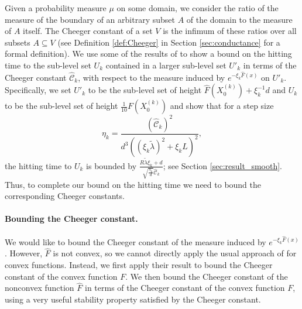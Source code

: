 \documentclass[final,12pt]{colt2018} %
\begin{document}
{Given a probability measure $\mu$ on some domain, we consider the ratio of the measure of the boundary of an arbitrary subset $A$ of the domain to the measure of $A$ itself.  
% 
The Cheeger constant of a set $V$ is the infimum of these ratios over all subsets $A \subseteq V$ (see Definition \ref{def:Cheeger} in  Section \ref{sec:conductance} for a formal definition).  
%
  We  use some of the results of \cite{hitting_times} to show a bound on the hitting time to the sub-level set $U_k$ contained in a larger sub-level set $U'_k$ in terms of the Cheeger constant $\hat{\mathcal{C}}_k$, with respect to the measure induced by $e^{-\xi_k\hat{F}(x)}$ on $U'_k$. 
   Specifically, we  set $U'_k$ to be the sub-level set of height $\hat{F}(X^{(k)}_0) + \xi_k^{-1}d$ and $U_k$ to be the sub-level set of height $\frac{1}{10}F(X^{(k)}_0)$ and show that for a step size 
   $$\eta_k = \frac{(\hat{\mathcal{C}}_k)^2}{d^3((\xi_k \tilde{\lambda})^2 + \xi_k L)^2},$$
    the hitting time to $U_k$ is bounded by $\frac{R \tilde{\lambda} \xi_k + d}{\sqrt{\frac{\eta_k}{d}} \hat{\mathcal{C}}_k}$; see Section \ref{sec:result_smooth}.
      Thus, to complete our bound on the hitting time we need to  bound  the corresponding Cheeger constants.
%
%

\paragraph{Bounding the Cheeger constant.}  We would like to bound the Cheeger constant of the measure induced by $e^{-\xi_k\hat{F}(x)}$.  
%
However, $\hat{F}$ is not convex, so we cannot directly apply the usual approach of  \cite{lovasz1993random} for convex functions. 
%
Instead, we first apply their result to bound the Cheeger constant of the convex function $F$. 
%
We then bound the Cheeger constant of the nonconvex function $\hat{F}$ in terms of the Cheeger constant of the convex function $F$, using a very useful stability property satisfied by the Cheeger constant.


}
\end{document}
